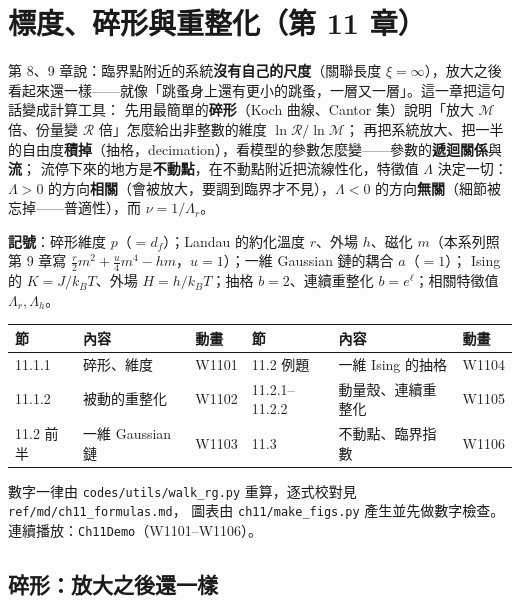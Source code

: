 

\section{標度、碎形與重整化（第 11 章）}

\begin{keybox}[先看這裡]
第 8、9 章說：臨界點附近的系統\textbf{沒有自己的尺度}（關聯長度 $\xi=\infty$），放大之後看起來還一樣——就像「跳蚤身上還有更小的跳蚤，一層又一層」。這一章把這句話變成計算工具：
先用最簡單的\textbf{碎形}（Koch 曲線、Cantor 集）說明「放大 $\mathcal M$ 倍、份量變 $\mathcal R$ 倍」怎麼給出非整數的維度 $\ln\mathcal R/\ln\mathcal M$；
再把系統放大、把一半的自由度\textbf{積掉}（抽格，decimation），看模型的參數怎麼變——參數的\textbf{遞迴關係}與\textbf{流}；
流停下來的地方是\textbf{不動點}，在不動點附近把流線性化，特徵值 $\Lambda$ 決定一切：$\Lambda>0$ 的方向\textbf{相關}（會被放大，要調到臨界才不見），$\Lambda<0$ 的方向\textbf{無關}（細節被忘掉——普適性），而 $\nu=1/\Lambda_r$。

\textbf{記號}：碎形維度 $p$（$=d_f$）；Landau 的約化溫度 $r$、外場 $h$、磁化 $m$（本系列照第 9 章寫 $\frac r2m^2+\frac u4m^4-hm$，$u=1$）；一維 Gaussian 鏈的耦合 $a$（$=1$）；
Ising 的 $K=J/k_BT$、外場 $H=h/k_BT$；抽格 $b=2$、連續重整化 $b=e^\ell$；相關特徵值 $\Lambda_r,\Lambda_h$。
\begin{center}
\small
\begin{tabular}{@{}lll@{\qquad}lll@{}}
\toprule
節 & 內容 & 動畫 & 節 & 內容 & 動畫\\
\midrule
11.1.1 & 碎形、維度 & W1101 & 11.2 例題 & 一維 Ising 的抽格 & W1104\\
11.1.2 & 被動的重整化 & W1102 & 11.2.1--11.2.2 & 動量殼、連續重整化 & W1105\\
11.2 前半 & 一維 Gaussian 鏈 & W1103 & 11.3 & 不動點、臨界指數 & W1106\\
\bottomrule
\end{tabular}
\end{center}
數字一律由 \texttt{codes/utils/walk\_rg.py} 重算，逐式校對見 \texttt{ref/md/ch11\_formulas.md}，
圖表由 \texttt{ch11/make\_figs.py} 產生並先做數字檢查。連續播放：\texttt{Ch11Demo}（W1101--W1106）。
\end{keybox}

\subsection{碎形：放大之後還一樣}
\leavevmode{}\ \par\nopagebreak

